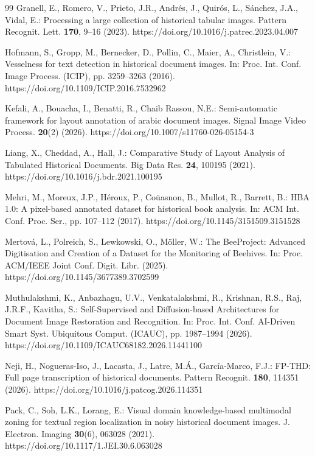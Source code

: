 \documentclass[pdflatex,sn-mathphys-num]{sn-jnl}
\begin{document}
\begin{thebibliography}{99}
Granell, E., Romero, V., Prieto, J.R., Andrés, J., Quirós, L., Sánchez, J.A., Vidal, E.: Processing a large collection of historical tabular images. Pattern Recognit. Lett. \textbf{170}, 9--16 (2023). https://doi.org/10.1016/j.patrec.2023.04.007

Hofmann, S., Gropp, M., Bernecker, D., Pollin, C., Maier, A., Christlein, V.: Vesselness for text detection in historical document images. In: Proc. Int. Conf. Image Process. (ICIP), pp. 3259--3263 (2016). https://doi.org/10.1109/ICIP.2016.7532962

Kefali, A., Bouacha, I., Benatti, R., Chaib Rassou, N.E.: Semi-automatic framework for layout annotation of arabic document images. Signal Image Video Process. \textbf{20}(2) (2026). https://doi.org/10.1007/s11760-026-05154-3

Liang, X., Cheddad, A., Hall, J.: Comparative Study of Layout Analysis of Tabulated Historical Documents. Big Data Res. \textbf{24}, 100195 (2021). https://doi.org/10.1016/j.bdr.2021.100195

Mehri, M., Moreux, J.P., Héroux, P., Coüasnon, B., Mullot, R., Barrett, B.: HBA 1.0: A pixel-based annotated dataset for historical book analysis. In: ACM Int. Conf. Proc. Ser., pp. 107--112 (2017). https://doi.org/10.1145/3151509.3151528

Mertová, L., Polreich, S., Lewkowski, O., Möller, W.: The BeeProject: Advanced Digitisation and Creation of a Dataset for the Monitoring of Beehives. In: Proc. ACM/IEEE Joint Conf. Digit. Libr. (2025). https://doi.org/10.1145/3677389.3702599

Muthulakshmi, K., Anbazhagu, U.V., Venkatalakshmi, R., Krishnan, R.S., Raj, J.R.F., Kavitha, S.: Self-Supervised and Diffusion-based Architectures for Document Image Restoration and Recognition. In: Proc. Int. Conf. AI-Driven Smart Syst. Ubiquitous Comput. (ICAUC), pp. 1987--1994 (2026). https://doi.org/10.1109/ICAUC68182.2026.11441100

Neji, H., Nogueras-Iso, J., Lacasta, J., Latre, M.Á., García-Marco, F.J.: FP-THD: Full page transcription of historical documents. Pattern Recognit. \textbf{180}, 114351 (2026). https://doi.org/10.1016/j.patcog.2026.114351

Pack, C., Soh, L.K., Lorang, E.: Visual domain knowledge-based multimodal zoning for textual region localization in noisy historical document images. J. Electron. Imaging \textbf{30}(6), 063028 (2021). https://doi.org/10.1117/1.JEI.30.6.063028


\end{thebibliography}
\end{document}
